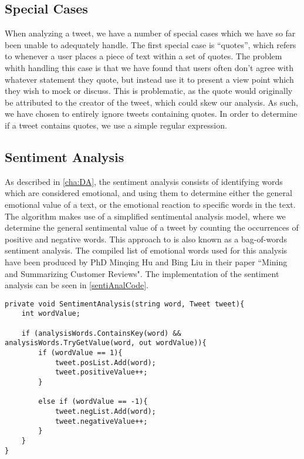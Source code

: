 \subsection{Special Cases}\label{AlgorithmCases}
When analyzing a tweet, we have a number of special cases which we have so far
been unable to adequately handle. The first special case is ``quotes'', which refers
to whenever a user places a piece of text within a set of quotes. The problem
whith handling this case is that we have found that users often don't agree
with whatever statement they quote, but instead use it to present a view point
which they wish to mock or discuss. This is problematic, as the quote would
originally be attributed to the creator of the tweet, which could skew our
analysis. As such, we have chosen to entirely ignore tweets containing quotes.
In order to determine if a tweet contains quotes, we use a simple regular
expression.

\subsection{Sentiment Analysis}
As described in \autoref{cha:DA}, the sentiment analysis consists of
identifying words which are considered emotional, and using them to determine
either the general emotional value of a text, or the emotional reaction to
specific words in the text. The algorithm makes use of a simplified sentimental
analysis model, where we determine the general sentimental value of a tweet by
counting the occurrences of positive and negative words. This approach to is
also known as a bag-of-words sentiment analysis\citep{BagOfWords}. The
compiled list of emotional words used for this analysis have been produced by
PhD Minqing Hu and Bing Liu in their paper ``Mining and Summarizing Customer
Reviews"\citep{Hu:2004:MSC:1014052.1014073}. The implementation of the sentiment
analysis can be seen in \autoref{sentiAnalCode}.\\

\begin{minipage}[H]{\linewidth}
\begin{lstlisting}[caption = Determining the sentiment of a tweet , label = sentiAnalCode] 
private void SentimentAnalysis(string word, Tweet tweet){
	int wordValue;

    if (analysisWords.ContainsKey(word) && analysisWords.TryGetValue(word, out wordValue)){
    	if (wordValue == 1){
        	tweet.posList.Add(word);
            tweet.positiveValue++;
        }

        else if (wordValue == -1){
        	tweet.negList.Add(word);
            tweet.negativeValue++;
        }
    }
}
\end{lstlisting}
\end{minipage}

